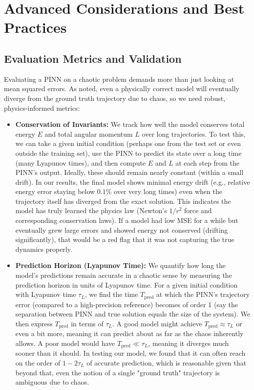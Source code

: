 \section{Advanced Considerations and Best Practices}

\subsection{Evaluation Metrics and Validation}

Evaluating a PINN on a chaotic problem demands more than just looking at mean squared errors.  As noted, even a physically correct model will eventually diverge from the ground truth trajectory due to chaos, so we need robust, physics-informed metrics:


\begin{itemize}

    \item \textbf{Conservation of Invariants:} We track how well the model conserves total energy $E$ and total angular momentum $L$ over long trajectories.  To test this, we can take a given initial condition (perhaps one from the test set or even outside the training set), use the PINN to predict its state over a long time (many Lyapunov times), and then compute $E$ and $L$ at each step from the PINN's output.  Ideally, these should remain nearly constant (within a small drift).  In our results, the final model shows minimal energy drift (e.g., relative energy error staying below $0.1\%$ over very long times) even when the trajectory itself has diverged from the exact solution.  This indicates the model has truly learned the physics law (Newton's $1/r^2$ force and corresponding conservation laws).  If a model had low MSE for a while but eventually grew large errors and showed energy not conserved (drifting significantly), that would be a red flag that it was not capturing the true dynamics properly. 
    
    
    
    
    \item \textbf{Prediction Horizon (Lyapunov Time):} 
    We quantify how long the model's predictions remain accurate in a chaotic sense by measuring the prediction horizon in units of Lyapunov time.  For a given initial condition with Lyapunov time $\tau_L$, 
    we find the time $T_{\text{pred}}$ at which the PINN's trajectory error (compared to a high-precision reference) becomes of order 1 (say the separation between PINN and true solution equals the size of the system).  
    We then express $T_{\text{pred}}$ in terms of $\tau_L$. A good model might achieve $T_{\text{pred}} \approx \tau_L$ or even a bit more, meaning it can predict about as far as the chaos inherently allows.  
    A poor model would have $T_{\text{pred}} \ll \tau_L$, meaning it diverges much sooner than it should.  In testing our model, we found that it can often reach on the order of $1-2\tau_L$ of accurate prediction, 
    which is reasonable given that beyond that, even the notion of a single "ground truth" trajectory is ambiguous due to chaos. 





\end{itemize}
